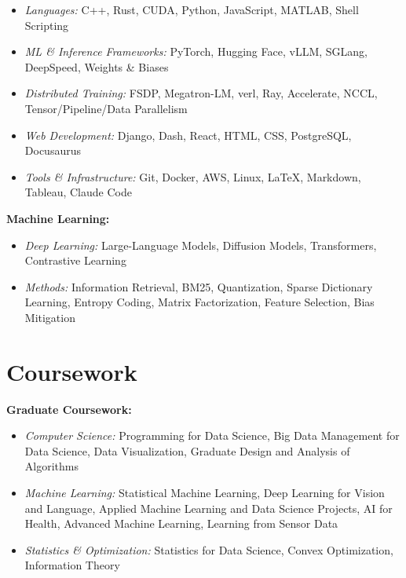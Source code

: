 \documentclass[11pt]{article}
\begin{document}
\begin{itemize}
    \item {\textit{Languages:}} C++, Rust, CUDA, Python, JavaScript, MATLAB, Shell Scripting
    \item {\textit{ML \& Inference Frameworks:}} PyTorch, Hugging Face, vLLM, SGLang, DeepSpeed, Weights \& Biases
    \item {\textit{Distributed Training:}} FSDP, Megatron-LM, verl, Ray, Accelerate, NCCL, Tensor/Pipeline/Data Parallelism
    \item {\textit{Web Development:}} Django, Dash, React, HTML, CSS, PostgreSQL, Docusaurus
    \item {\textit{Tools \& Infrastructure:}} Git, Docker, AWS, Linux, LaTeX, Markdown, Tableau, Claude Code
\end{itemize}

\vspace{\lineskip}

\textbf{Machine Learning:}

\begin{itemize}
    \item {\textit{Deep Learning:}} Large-Language Models, Diffusion Models, Transformers, Contrastive Learning
    \item {\textit{Methods:}} Information Retrieval, BM25, Quantization, Sparse Dictionary Learning, Entropy Coding, Matrix Factorization, Feature Selection, Bias Mitigation
\end{itemize}


\section*{Coursework}

\textbf{Graduate Coursework:}

\begin{itemize}
    \item {\textit{Computer Science:}} Programming for Data Science, Big Data Management for Data Science, Data Visualization, Graduate Design and Analysis of Algorithms
    \item {\textit{Machine Learning:}} Statistical Machine Learning, Deep Learning for Vision and Language, Applied Machine Learning and Data Science Projects, AI for Health, Advanced Machine Learning, Learning from Sensor Data
    \item {\textit{Statistics \& Optimization:}} Statistics for Data Science, Convex Optimization, Information Theory
\end{itemize}
\end{document}
